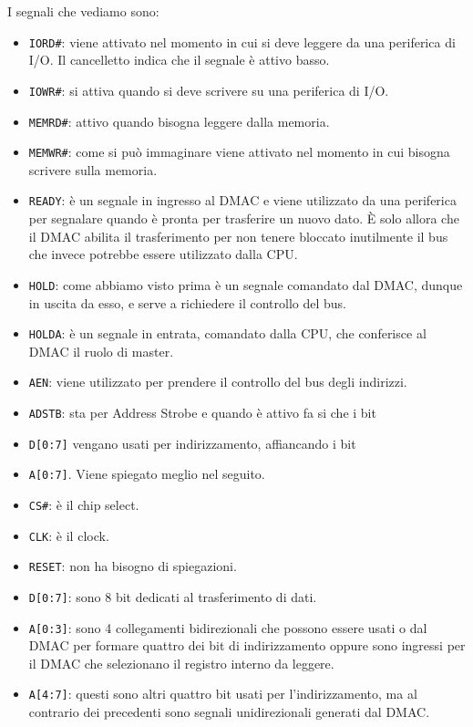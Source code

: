 \documentclass[11pt]{book}
\begin{document}
I segnali che vediamo sono:
\begin{itemize}
\item {\tt IORD\#}: viene attivato nel momento in cui si deve leggere
  da una periferica di I/O. Il cancelletto indica che il segnale \`e
  attivo basso.
\item {\tt IOWR\#}: si attiva quando si deve scrivere su una
  periferica di I/O.
\item {\tt MEMRD\#}: attivo quando bisogna leggere dalla memoria.
\item {\tt MEMWR\#}: come si pu\`o immaginare viene attivato nel
  momento in cui bisogna scrivere sulla memoria.
\item {\tt READY}: \`e un segnale in ingresso al DMAC e viene
  utilizzato da una periferica per segnalare quando \`e pronta per
  trasferire un nuovo dato. \`E solo allora che il DMAC abilita il
  trasferimento per non tenere bloccato inutilmente il bus che invece
  potrebbe essere utilizzato dalla CPU.
\item {\tt HOLD}: come abbiamo visto prima \`e un segnale comandato
  dal DMAC, dunque in uscita da esso, e serve a richiedere il
  controllo del bus.
\item {\tt HOLDA}: \`e un segnale in entrata, comandato dalla CPU, che
  conferisce al DMAC il ruolo di master.
\item {\tt AEN}: viene utilizzato per prendere il controllo del bus
  degli indirizzi.
\item {\tt ADSTB}: sta per Address Strobe e quando \`e attivo fa si
  che i bit \item {\tt D[0:7]} vengano usati per indirizzamento,
  affiancando i bit \item {\tt A[0:7]}. Viene spiegato meglio nel
  seguito.
\item {\tt CS\#}: \`e il chip select.
\item {\tt CLK}: \`e il clock.
\item {\tt RESET}: non ha bisogno di spiegazioni.
\item {\tt D[0:7]}: sono 8 bit dedicati al trasferimento di dati.
\item {\tt A[0:3]}: sono 4 collegamenti bidirezionali che possono
  essere usati o dal DMAC per formare quattro dei bit di
  indirizzamento oppure sono ingressi per il DMAC che selezionano il
  registro interno da leggere.
\item {\tt A[4:7]}: questi sono altri quattro bit usati per
  l'indirizzamento, ma al contrario dei precedenti sono segnali
  unidirezionali generati dal DMAC.

\end{itemize}
\end{document}
